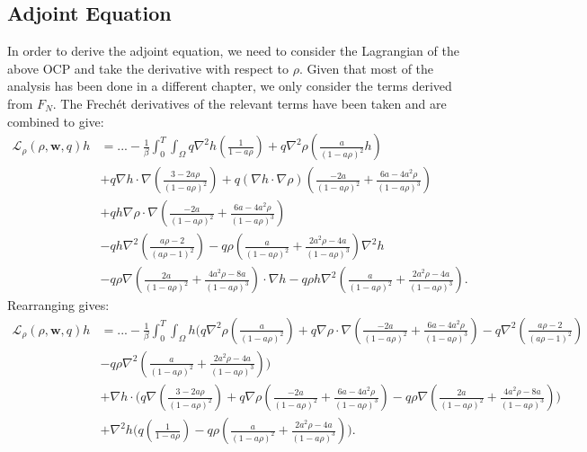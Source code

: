 \documentclass[11pt, a4paper]{article}
\theoremstyle{definition}
\newcommand{\w}{\mathbf{w}}
\begin{document}
\subsection{Adjoint Equation}
In order to derive the adjoint equation, we need to consider the Lagrangian of the above OCP and take the derivative with respect to $\rho$. Given that most of the analysis has been done in a different chapter, we only consider the terms derived from $F_{N}$.
The Frech\'et derivatives of the relevant terms have been taken and are combined to give:
\begin{align*}
	\mathcal{L}_\rho(\rho,\w,q)h &= ... -\frac{1}{\beta}\int_0^T \int_\Omega q \nabla^2 h \left(\frac{1}{1- a\rho} \right) + q\nabla^2 \rho \left(\frac{a}{(1- a\rho)^2}h\right)\\
	&+ q\nabla h \cdot \nabla \left( \frac{3-2a\rho}{(1-a\rho)^2} \right) + q\left(\nabla h \cdot \nabla \rho \right) \left( \frac{-2a }{(1-a\rho)^2} + \frac{6a-4a^2  \rho}{(1-a\rho)^3}  \right) \\
	&+ qh \nabla \rho \cdot \nabla \left(\frac{-2a }{(1-a\rho)^2} + \frac{6a-4a^2  \rho}{(1-a\rho)^3}  \right)\\
	&- qh \nabla^2 \left(\frac{a\rho -2}{(a\rho -1)^2}\right) - q\rho  \left(\frac{a }{(1-a\rho)^2} + \frac{2a^2\rho -4a}{(1-a\rho)^3} \right)\nabla^2 h \\
	&- q\rho \nabla \left(\frac{2a }{(1-a\rho)^2} + \frac{4a^2\rho -8a}{(1-a\rho)^3} \right) \cdot \nabla h - q\rho h \nabla^2  \left(\frac{a }{(1-a\rho)^2} + \frac{2a^2\rho -4a}{(1-a\rho)^3} \right).
\end{align*}
Rearranging gives:
\begin{align*}
	\mathcal{L}_\rho(\rho,\w,q)h &=... -\frac{1}{\beta}\int_0^T \int_\Omega h \bigg(q\nabla^2 \rho \left(\frac{a}{(1- a\rho)^2}\right)  + q \nabla \rho \cdot \nabla \left(\frac{-2a }{(1-a\rho)^2} + \frac{6a-4a^2  \rho}{(1-a\rho)^3}  \right) - q \nabla^2 \left(\frac{a\rho -2}{(a\rho -1)^2}\right)\\
	&- q\rho  \nabla^2  \left(\frac{a }{(1-a\rho)^2} + \frac{2a^2\rho -4a}{(1-a\rho)^3} \right)\bigg)\\
	&+ \nabla h \cdot \bigg( q  \nabla \left( \frac{3-2a\rho}{(1-a\rho)^2} \right) + q \nabla \rho  \left( \frac{-2a }{(1-a\rho)^2} + \frac{6a-4a^2  \rho}{(1-a\rho)^3}  \right)- q\rho \nabla \left(\frac{2a }{(1-a\rho)^2} + \frac{4a^2\rho -8a}{(1-a\rho)^3} \right) \bigg)\\
	&+ \nabla^2 h \bigg(q \left(\frac{1}{1- a\rho} \right)  - q\rho  \left(\frac{a }{(1-a\rho)^2} + \frac{2a^2\rho -4a}{(1-a\rho)^3} \right)  \bigg).
\end{align*}
\end{document}
